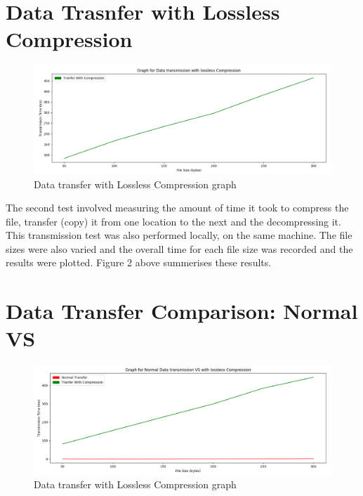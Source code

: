 \documentclass[12pt]{article}
\begin{document}
	\section{Data Trasnfer with Lossless Compression}
	\begin{figure}[ht]
		\begin{center}
			\includegraphics[scale=0.4]{Figure_2.png}
		\end{center}
		\caption{Data transfer with Lossless Compression graph}
	\end{figure}
	
	\begin{flushleft}
		The second test involved measuring the amount of time it took to compress the file, transfer (copy) it from one location to the next and the decompressing it. This transmission test was also performed locally, on the same machine. The file sizes were also varied and the overall time for each file size was recorded and the results were plotted. Figure 2 above summerises these results.
	\end{flushleft}
	
	
	\section{Data Transfer Comparison: Normal VS }
	\begin{figure}[ht]
		\begin{center}
			\includegraphics[scale=0.4]{Figure_3.png}
		\end{center}
		\caption{Data transfer with Lossless Compression graph}
	\end{figure}
	
\end{document}
